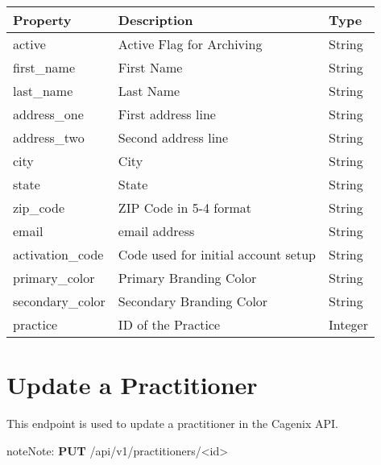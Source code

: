 \documentclass[letterpaper,10pt,english]{sphinxmanual}
\begin{document}
\begin{tabulary}{\linewidth}{|L|L|L|}
\hline
\textsf{\relax 
Property
} & \textsf{\relax 
Description
} & \textsf{\relax 
Type
}\\
\hline
active
 & 
Active Flag for Archiving
 & 
String
\\

first\_name
 & 
First Name
 & 
String
\\

last\_name
 & 
Last Name
 & 
String
\\

address\_one
 & 
First address line
 & 
String
\\

address\_two
 & 
Second address line
 & 
String
\\

city
 & 
City
 & 
String
\\

state
 & 
State
 & 
String
\\

zip\_code
 & 
ZIP Code in 5-4 format
 & 
String
\\

email
 & 
email address
 & 
String
\\

activation\_code
 & 
Code used for initial account
setup
 & 
String
\\

primary\_color
 & 
Primary Branding Color
 & 
String
\\

secondary\_color
 & 
Secondary Branding Color
 & 
String
\\

practice
 & 
ID of the Practice
 & 
Integer
\\
\hline\end{tabulary}



\section{Update a Practitioner}
\label{dev-api-practitioners:update-a-practitioner}
This endpoint is used to update a practitioner in the Cagenix API.

\begin{notice}{note}{Note:}
\textbf{PUT} /api/v1/practitioners/\textless{}id\textgreater{}
\end{notice}
\end{document}
